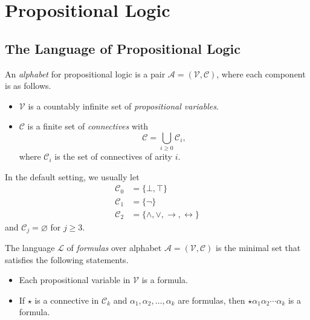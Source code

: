 \chapter{Propositional Logic}
\section{The Language of Propositional Logic}
\begin{definition}
  An \emph{alphabet} for propositional logic is a pair
  $\mathcal{A} = (\mathcal{V}, \mathcal{C})$, where each component is as
  follows.
  \begin{itemize}
    \item $\mathcal{V}$ is a countably infinite set of
    \emph{propositional variables}.
    \item $\mathcal{C}$ is a finite set of \emph{connectives} with
    \begin{equation*}
      \mathcal{C} = \bigcup_{i \geq 0} \mathcal{C}_i,
    \end{equation*}
    where $\mathcal{C}_i$ is the set of connectives of arity $i$.
  \end{itemize}
\end{definition}

\begin{remark}
  In the default setting, we usually let
  \begin{align*}
    \mathcal{C}_0 &= \{\bot, \top\} \\
    \mathcal{C}_1 &= \{\neg\} \\
    \mathcal{C}_2 &= \{\wedge, \vee, \to, \leftrightarrow\}
  \end{align*}
  and $\mathcal{C}_j = \varnothing$ for $j \geq 3$.
\end{remark}

\begin{definition}
  The language $\mathcal{L}$ of \emph{formulas} over alphabet
  $\mathcal{A} = (\mathcal{V}, \mathcal{C})$ is the minimal set that satisfies
  the following statements.
  \begin{itemize}
    \item Each propositional variable in $\mathcal{V}$ is a formula.
    \item If $\star$ is a connective in $\mathcal{C}_k$ and
    $\alpha_1, \alpha_2, \dots, \alpha_k$ are formulas,
    then $\star\alpha_1\alpha_2\cdots\alpha_k$ is a formula.
  \end{itemize}
\end{definition}

